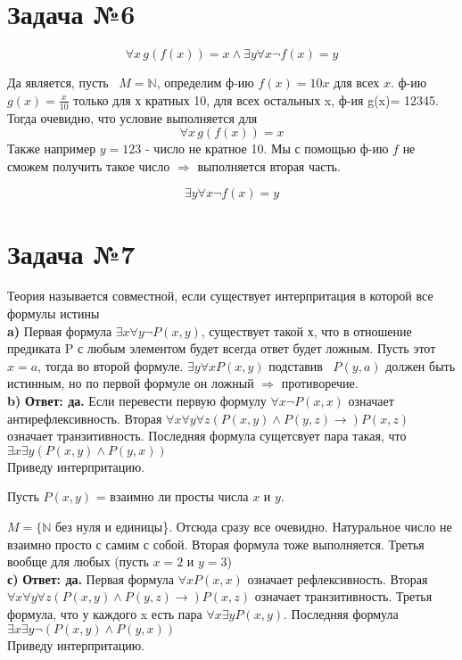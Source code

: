 \documentclass[a4paper,12pt]{article} %
\begin{document}
\section*{Задача №6}
\[
    \forall x \, g(f(x)) = x \wedge \exists y \forall x \neg f(x) = y
\]

Да является, пусть  $M = \mathbb{N}$, определим ф-ию $f(x) = 10x$ для всех $x$.
ф-ию $g(x) = \frac{x} {10}$ только для х кратных 10, для всех остальных x, ф-ия g(x)= 12345.
Тогда очевидно, что условие выполняется для 
\[
    \forall x \, g(f(x)) = x
\]
Также например $y = 123$ - число не кратное 10.
Мы с помощью ф-ию $f$ не сможем получить такое число $\Rightarrow$
выполняется вторая часть.

\[
    \exists y \forall x \neg f(x) = y
\]


\section*{Задача №7}
Теория называется совместной, если существует интерпритация в которой все формулы истины \\
\textbf{a)}
Первая формула $\exists x \forall y \neg P(x, y)$, существует такой х, что в отношение предиката P с любым
элементом будет всегда ответ будет ложным. Пусть этот $x = a$, тогда во второй формуле. 
$\exists y \forall x P(x, y)$ подставив  $P(y, a)$ должен быть истинным, но по первой формуле он ложный 
$\Rightarrow$ противоречие. \\
\textbf{b)}
\textbf{Ответ: да.}
Если перевести первую формулу $\forall x \neg P(x, x)$ означает антирефлексивность.
Вторая $\forall x \forall y \forall z (P(x, y) \wedge P(y, z) \rightarrow) P(x, z)$ означает транзитивность.
Последняя формула сущетсвует пара такая, что 
$\exists x \exists y (P(x, y) \wedge P(y, x))$
\\ Приведу интерпритацию. 

Пусть $P(x, y)$ = взаимно ли просты числа $x$ и $y$.

$M = \{ \mathbb{N}$ без нуля и единицы\}. Отсюда сразу все очевидно.
Натуральное число не взаимно просто с самим с собой. Вторая формула тоже выполняется. 
Третья вообще для любых (пусть $x = 2$ и $y = 3$) \\
\textbf{с)}
\textbf{Ответ: да.}
Первая формула $\forall x P(x, x)$ означает рефлексивность.
Вторая $\forall x \forall y \forall z (P(x, y) \wedge P(y, z) \rightarrow) P(x, z)$ означает транзитивность.
Третья формула, что у каждого x есть пара $\forall x \exists y P(x, y)$.
Последняя формула
$\exists x \exists y \neg(P(x, y) \wedge P(y, x))$
\\ Приведу интерпритацию.
\end{document}
